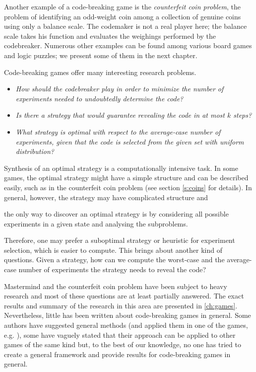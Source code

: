 Another example of a code-breaking game is the \emph{counterfeit coin problem},
  the problem of identifying an odd-weight coin among
  a collection of genuine coins using only a balance scale.
The codemaker is not a real player here; the balance scale takes his function
  and evaluates the weighings performed by the codebreaker.
Numerous other examples can be found among various board games and logic puzzles;
 we present some of them in the next chapter.

Code-breaking games offer many interesting research problems.

\begin{itemize}
\item \emph{How should the codebreaker play in order to minimize the number of experiments
   needed to undoubtedly determine the code?}
\item \emph{Is there a strategy that would guarantee
   revealing the code in at most $k$ steps?}
\item \emph{What strategy is optimal with respect
   to the average-case number of experiments,
   given that the code is selected
   from the given set with uniform distribution?}
\end{itemize}

Synthesis of an optimal strategy is a computationally intensive task.
In some games, the optimal strategy might have a simple
  structure and can be described easily, such as in
  the counterfeit coin problem (see section \autoref{s:coins} for details).
In general, however, the strategy may have complicated structure and


the only way
  to discover an optimal strategy is by considering all possible experiments
  in a given state and analysing the subproblems.

Therefore, one may prefer a suboptimal strategy or heuristic
  for experiment selection,
  which is easier to compute.
This brings about another kind of questions.
Given a strategy,
  how can we compute the worst-case and the average-case number
  of experiments the strategy needs to reveal the code?

Mastermind and the counterfeit coin problem have been subject to
heavy research and most of these questions are at least partially answered.
The exact results and summary of the research in this area are presented
  in \autoref{ch:games}.
Nevertheless, little has been written about code-breaking games in general.
Some authors have suggested general methods (and applied them in one of the games,
  e.g. \cite{cbg-stgopt, cbg-gen}),
  some have vaguely stated that their approach can be applied
  to other games of the same kind but,
  to the best of our knowledge, no one has tried to
  create a general framework and provide
   results for code-breaking games in general.

